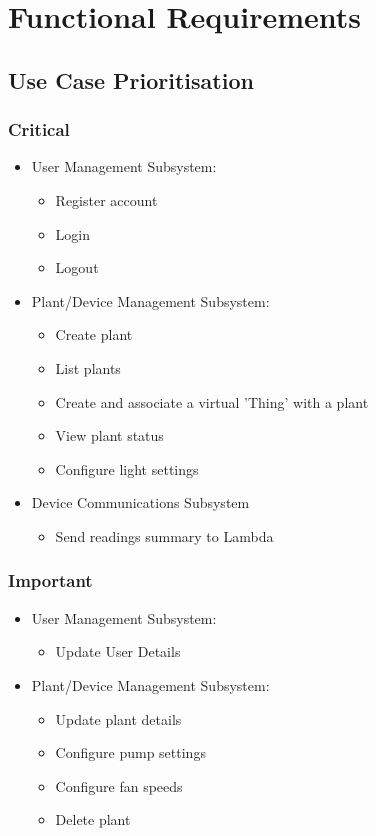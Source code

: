 \documentclass{article}
\begin{document}
\section{Functional Requirements}
\subsection{Use Case Prioritisation}
\subsubsection{Critical}
\begin{itemize}
	\item User Management Subsystem:
	\begin{itemize}
		\item Register account
		\item Login
		\item Logout
	\end{itemize}
	
	\item Plant/Device Management Subsystem:
	\begin{itemize}
		\item Create plant
		\item List plants
		\item Create and associate a virtual 'Thing' with a plant
		\item View plant status
		\item Configure light settings
	\end{itemize}
	
	\item Device Communications Subsystem
	\begin{itemize}
		\item Send readings summary to Lambda
	\end{itemize}
\end{itemize}

\subsubsection{Important}
\begin{itemize}
	\item User Management Subsystem:
	\begin{itemize}
		\item Update User Details
	\end{itemize}
	
	\item Plant/Device Management Subsystem:
	\begin{itemize}
		\item Update plant details
		\item Configure pump settings
		\item Configure fan speeds
		\item Delete plant
	\end{itemize}
\end{itemize}
\end{document}
